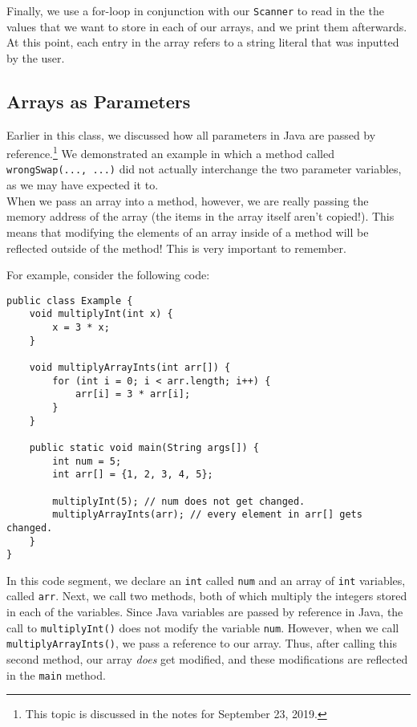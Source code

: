  Finally, we use a for-loop in conjunction with our \verb!Scanner! to read in the the values that we want to store in each of our arrays, and we print them afterwards. At this point, each entry in the array refers to a string literal that was inputted by the user. \\
 
 \subsection{Arrays as Parameters}

Earlier in this class, we discussed how all parameters in Java are passed by reference.\footnote{This topic is discussed in the notes for September 23, 2019.} We demonstrated an example in which a method called \verb!wrongSwap(..., ...)! did not actually interchange the two parameter variables, as we may have expected it to. \\

When we pass an array into a method, however, we are really passing the memory address of the array (the items in the array itself aren't copied!). This means that modifying the elements of an array inside of a method will be reflected outside of the method! This is very important to remember.

For example, consider the following code:

\begin{lstlisting}
public class Example {
    void multiplyInt(int x) {
        x = 3 * x;
    }
    
    void multiplyArrayInts(int arr[]) {
        for (int i = 0; i < arr.length; i++) {
            arr[i] = 3 * arr[i];
        }
    }
    
    public static void main(String args[]) {
        int num = 5;
        int arr[] = {1, 2, 3, 4, 5};
        
        multiplyInt(5); // num does not get changed.
        multiplyArrayInts(arr); // every element in arr[] gets changed.
    }
}
\end{lstlisting}

In this code segment, we declare an \verb!int! called \verb!num! and an array of \verb!int! variables, called \verb!arr!. Next, we call two methods, both of which multiply the integers stored in each of the variables. Since Java variables are passed by reference in Java, the call to \verb!multiplyInt()! does not modify the variable \verb!num!. However, when we call \verb!multiplyArrayInts()!, we pass a reference to our array. Thus, after calling this second method, our array \textit{does} get modified, and these modifications are reflected in the \verb!main! method. \\

